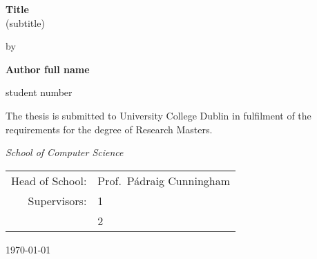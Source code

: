 \begin{titlepage}%
\begin{center}

\Huge
\textbf{Title}\\
\small
(subtitle)
\vfill

\Large
by

\vfill

\textbf{Author full name}

\small
student number

\vfill

\Large
The thesis is submitted to University College Dublin in fulfilment of the requirements for the
degree of Research Masters.

\vfill

\emph{School of Computer Science}

\vfill

\normalsize

\begin{tabular}{rl}
Head of School: & Prof.\ Pádraig Cunningham \\
Supervisors: & 1\\
            & 2
\end{tabular}

\vfill

\Large
\today

\end{center}
\end{titlepage}